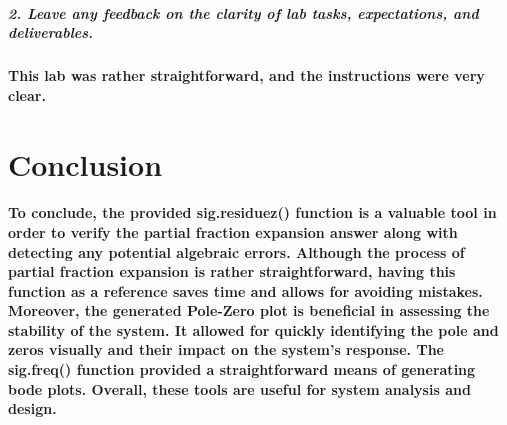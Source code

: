 \documentclass[12pt,a4paper]{article}
\begin{document}
\subparagraph{\large 2. Leave any feedback on the clarity of lab tasks, expectations, and deliverables.}

\paragraph{This lab was rather straightforward, and the instructions were very clear.}

\section{Conclusion}\label{sec:res}

\paragraph{To conclude, the provided sig.residuez() function is a valuable tool in order to verify the partial fraction expansion answer along with detecting any potential algebraic errors. Although the process of partial fraction expansion is rather straightforward, having this function as a reference saves time and allows for avoiding mistakes. \newline
Moreover, the generated Pole-Zero plot is beneficial in assessing the stability of the system. It allowed for quickly identifying the pole and zeros visually and their impact on the system's response. \newline
The sig.freq() function provided a straightforward means of generating bode plots. Overall, these tools are useful for system analysis and design.}







\end{document}
